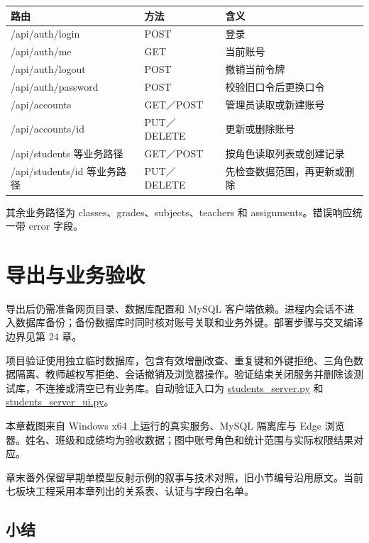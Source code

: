 \begin{center}
\begin{tabular}{lll}
\toprule
路由 & 方法 & 含义 \\
\midrule
/api/auth/login & POST & 登录 \\
/api/auth/me & GET & 当前账号 \\
/api/auth/logout & POST & 撤销当前令牌 \\
/api/auth/password & POST & 校验旧口令后更换口令 \\
/api/accounts & GET／POST & 管理员读取或新建账号 \\
/api/accounts/id & PUT／DELETE & 更新或删除账号 \\
/api/students 等业务路径 & GET／POST & 按角色读取列表或创建记录 \\
/api/students/id 等业务路径 & PUT／DELETE & 先检查数据范围，再更新或删除 \\
\bottomrule
\end{tabular}
\end{center}

其余业务路径为 classes、grades、subjects、teachers 和 assignments。错误响应统一带 error 字段。

\section{导出与业务验收}

导出后仍需准备网页目录、数据库配置和 MySQL 客户端依赖。进程内会话不进入数据库备份；备份数据库时同时核对账号关联和业务外键。部署步骤与交叉编译边界见第 24 章。

项目验证使用独立临时数据库，包含有效增删改查、重复键和外键拒绝、三角色数据隔离、教师越权写拒绝、会话撤销及浏览器操作。验证结束关闭服务并删除该测试库，不连接或清空已有业务库。自动验证入口为 \href{https://github.com/rabbitc999/ChaLi/blob/master/tests/students_server.py}{students\_server.py} 和 \href{https://github.com/rabbitc999/ChaLi/blob/master/tests/students_server_ui.py}{students\_server\_ui.py}。

本章截图来自 Windows x64 上运行的真实服务、MySQL 隔离库与 Edge 浏览器。姓名、班级和成绩均为验收数据；图中账号角色和统计范围与实际权限结果对应。

章末番外保留早期单模型反射示例的叙事与技术对照，旧小节编号沿用原文。当前七板块工程采用本章列出的关系表、认证与字段白名单。

\subsection*{小结}


